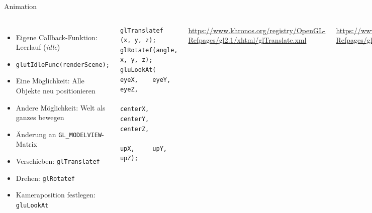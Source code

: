 \begin{frame}[fragile]{Animation}
%
\begin{columns}[T]
\begin{itemize}
\item Eigene Callback-Funktion: Leerlauf (\emph{idle})
\item \texttt{glutIdleFunc(renderScene);}
\item Eine Möglichkeit: Alle Objekte neu positionieren
\item Andere Möglichkeit: Welt als ganzes bewegen
\item[$\Rightarrow$] Änderung an \texttt{GL\_MODELVIEW}-Matrix
\item Verschieben: \texttt{glTranslatef}
\item Drehen: \texttt{glRotatef}
\item Kameraposition festlegen: \texttt{gluLookAt}
\end{itemize}
%
\vspace{-10pt}
\begin{codebox}
\begin{verbatim}
glTranslatef    (x, y, z);
glRotatef(angle, x, y, z);
gluLookAt(   eyeX,    eyeY,    eyeZ,
          centerX, centerY, centerZ,
              upX,     upY,     upZ);
\end{verbatim}
\end{codebox}
%
{\tiny
\url{https://www.khronos.org/registry/OpenGL-Refpages/gl2.1/xhtml/glTranslate.xml}

\url{https://www.khronos.org/registry/OpenGL-Refpages/gl2.1/xhtml/glRotate.xml}

\url{https://www.khronos.org/registry/OpenGL-Refpages/gl2.1/xhtml/gluLookAt.xml}\\
}
\end{columns}

%
\end{frame}


